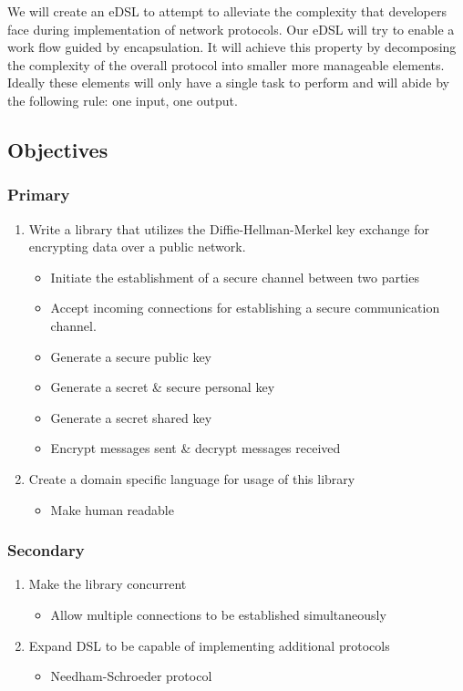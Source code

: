 We will create an eDSL to attempt to alleviate the complexity that developers face during implementation of network protocols. Our eDSL will try to enable a work flow guided by encapsulation. It will achieve this property by decomposing the complexity of the overall protocol into smaller more manageable elements. Ideally these elements will only have a single task to perform and will abide by the following rule: one input, one output. 



\subsection{Objectives}
\label{sec:objectives}
\subsubsection{Primary}
\begin{enumerate}
    \item Write a library that utilizes the Diffie-Hellman-Merkel key exchange for encrypting data 
over a public network.
        \begin{itemize}
            \item Initiate the establishment of a secure channel between two parties 
            \item Accept incoming connections for establishing a secure communication channel. 
            \item Generate a secure public key 
            \item Generate a secret \& secure personal key 
            \item Generate a secret shared key 
            \item Encrypt messages sent \& decrypt messages received
        \end{itemize}
    \item Create a domain specific language for usage of this library
        \begin{itemize}
            \item Make human readable
        \end{itemize}
\end{enumerate}
\subsubsection{Secondary}
\begin{enumerate}
    \item Make the library concurrent
        \begin{itemize}
            \item Allow multiple connections to be established simultaneously
        \end{itemize}
    \item Expand DSL to be capable of implementing additional protocols
        \begin{itemize}
            \item Needham-Schroeder protocol 
        \end{itemize}
\end{enumerate}

